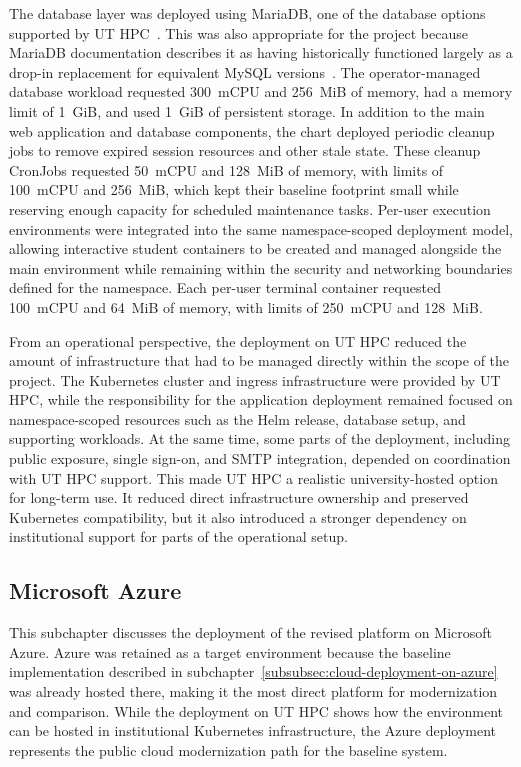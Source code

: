 The database layer was deployed using MariaDB, one of the database options supported by UT HPC~\cite{ut_hpc_kubernetes_databases_2025}.
This was also appropriate for the project because MariaDB documentation describes it as having historically functioned largely as a drop-in replacement for equivalent MySQL versions~\cite{mariadb_mysql_compatibility}.
The operator-managed database workload requested 300~mCPU and 256~MiB of memory, had a memory limit of 1~GiB, and used 1~GiB of persistent storage.
In addition to the main web application and database components, the chart deployed periodic cleanup jobs to remove expired session resources and other stale state.
These cleanup CronJobs requested 50~mCPU and 128~MiB of memory, with limits of 100~mCPU and 256~MiB, which kept their baseline footprint small while reserving enough capacity for scheduled maintenance tasks.
Per-user execution environments were integrated into the same namespace-scoped deployment model, allowing interactive student containers to be created and managed alongside the main environment while remaining within the security and networking boundaries defined for the namespace.
Each per-user terminal container requested 100~mCPU and 64~MiB of memory, with limits of 250~mCPU and 128~MiB\@.

From an operational perspective, the deployment on UT HPC reduced the amount of infrastructure that had to be managed directly within the scope of the project.
The Kubernetes cluster and ingress infrastructure were provided by UT HPC, while the responsibility for the application deployment remained focused on namespace-scoped resources such as the Helm release, database setup, and supporting workloads.
At the same time, some parts of the deployment, including public exposure, single sign-on, and SMTP integration, depended on coordination with UT HPC support.
This made UT HPC a realistic university-hosted option for long-term use.
It reduced direct infrastructure ownership and preserved Kubernetes compatibility, but it also introduced a stronger dependency on institutional support for parts of the operational setup.

\subsection{Microsoft Azure} \label{subsec:microsoft-azure}
This subchapter discusses the deployment of the revised platform on Microsoft Azure.
Azure was retained as a target environment because the baseline implementation described in subchapter~\ref{subsubsec:cloud-deployment-on-azure} was already hosted there, making it the most direct platform for modernization and comparison.
While the deployment on UT HPC shows how the environment can be hosted in institutional Kubernetes infrastructure, the Azure deployment represents the public cloud modernization path for the baseline system.

